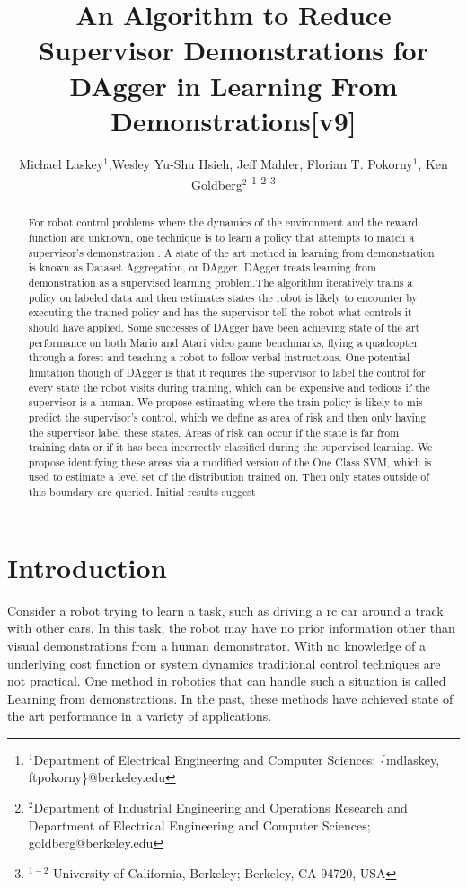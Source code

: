 \documentclass[10pt, conference]{ieeeconf}      %
\title{\LARGE \bf
An Algorithm to Reduce Supervisor Demonstrations for DAgger in Learning From Demonstrations[v9] }
\author{Michael Laskey$^1$,Wesley Yu-Shu Hsieh, Jeff Mahler, Florian T. Pokorny$^1$, Ken Goldberg$^2$%
\thanks{$^1$Department of Electrical Engineering and Computer Sciences; {\small \{mdlaskey, ftpokorny\}@berkeley.edu}}%
\thanks{$^2$Department of Industrial Engineering and Operations Research and Department of Electrical Engineering and Computer Sciences; {\small goldberg@berkeley.edu}}%
\thanks{$^{1-2}$ University of California, Berkeley;  Berkeley, CA 94720, USA}%
}
\begin{document}
\maketitle
\thispagestyle{empty}
\pagestyle{empty}



\begin{abstract}
For robot control problems where the dynamics of the environment and the reward function are unknown, one technique is to learn a policy that attempts to match a supervisor's demonstration . A state of the art method in learning from demonstration is known as Dataset Aggregation, or DAgger. DAgger treats learning from demonstration as a supervised learning problem.The algorithm iteratively trains a policy on labeled data and then estimates states the robot is likely to encounter by executing the trained policy and has the supervisor tell the robot what controls it should have applied. Some successes of DAgger have been achieving state of the art performance on both Mario and Atari video game benchmarks, flying a quadcopter through a forest and teaching a robot to follow verbal instructions. One potential limitation though of DAgger is that it requires the supervisor to label the control for every state the robot visits during training, which can be expensive and tedious if the supervisor is a human. We propose estimating where the train policy is likely to mis-predict the supervisor's control, which we define as area of risk and then only having the supervisor label these states. Areas of risk can occur if the state is far from training data or if it has been incorrectly classified during the supervised learning. We propose identifying these areas via a modified version of the One Class SVM, which is used to estimate a level set of the distribution trained on. Then only states outside of this boundary are queried. Initial results suggest 

\end{abstract}



\section{Introduction}
 Consider a robot trying to learn a task, such as driving a rc car around a track with other cars. In this task, the robot may have no prior information other than visual demonstrations from a human demonstrator. With no knowledge of a underlying cost function or system dynamics traditional control techniques are not practical.  One method in robotics that can handle such a situation is called Learning from demonstrations.  In the past, these methods  have  achieved state of the art performance  in a variety of applications.\cite{ross2013learning,pomerleau1989alvinn,schulman2013case} 
\end{document}
